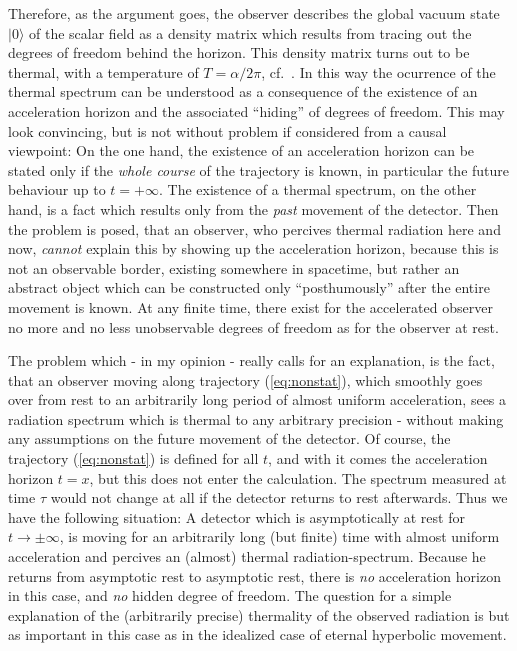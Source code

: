 \documentclass[a4paper,12pt]{article}
\newcommand{\ket}[1]{|#1\rangle }
\newcommand{\vac}{\ket{0}}
\begin{document}
Therefore, as the argument goes, the observer describes the global vacuum state 
$\vac$ of the 
scalar field as a density matrix which results from tracing out the degrees of freedom 
behind the horizon. This density matrix turns out to be thermal, with a temperature of 
$T=\alpha/2\pi$, cf.\ \cite{wald}. In this way the ocurrence of the thermal spectrum 
can be
understood as a consequence of the existence of an acceleration horizon and the 
associated ``hiding'' of degrees of freedom. 
This may look convincing, but is not without problem if considered from a causal 
viewpoint: On the one hand, the existence of an acceleration horizon can be stated
only if the {\em whole course} of the trajectory is known, in particular the future
behaviour up to $t=+\infty$. The existence of a thermal spectrum, on the other hand, 
is a fact which results only from the {\em past} movement of the detector. Then the
problem is posed, that an observer, who percives thermal radiation here and now,
{\em cannot} explain this by showing up the acceleration horizon, because this is not
an observable border, existing somewhere in spacetime, but rather an abstract object
which can be constructed only ``posthumously'' after the entire movement is known.
At any finite time, there exist for the accelerated observer no more and no less 
unobservable degrees of freedom as for the observer at rest.

The problem which - in my opinion - really calls for an explanation, is the fact,
that an observer moving along trajectory (\ref{eq:nonstat}), which smoothly goes over 
from rest to 
an arbitrarily long period of almost uniform acceleration, sees a radiation spectrum
which is thermal to any arbitrary precision - without making any assumptions on 
the future movement of the detector. Of course, the trajectory (\ref{eq:nonstat}) 
is defined for all
$t$, and with it comes the acceleration horizon $t=x$, but this does not enter the 
calculation. 
The spectrum measured at time $\tau$ would not change at all if the detector returns
to rest afterwards. Thus we have the following situation: A detector which is 
asymptotically at rest for $t\to\pm\infty$, is moving for an arbitrarily long 
(but finite) time with almost uniform acceleration and percives an (almost) thermal
radiation-spectrum. Because he returns from asymptotic rest to asymptotic rest, there
is {\em no} acceleration horizon in this case, and {\em no} hidden degree of freedom.
The question for a simple explanation of the (arbitrarily precise) thermality of the
observed radiation is but as important in this case as in the idealized case of
eternal hyperbolic movement.
\end{document}
